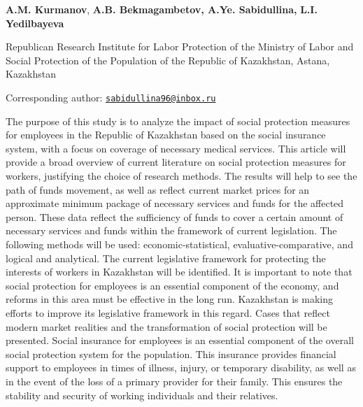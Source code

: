 
\begin{articleheader}

{\bfseries A.M. Kurmanov}, {\bfseries A.B. Bekmagambetov, A.Ye.
Sabidullina\textsuperscript{\envelope },} {\bfseries L.I. Yedilbayeva}
\end{articleheader}
\begin{affiliation}

Republican Research Institute for Labor Protection of the Ministry of
Labor and Social Protection of the Population of the Republic of
Kazakhstan, Astana, Kazakhstan

\raggedright{\bfseries \textsuperscript{\envelope }}Corresponding author:
\href{mailto:sabidullina96@inbox.ru}{\nolinkurl{sabidullina96@inbox.ru}}
\end{affiliation}

The purpose of this study is to analyze the impact of social protection
measures for employees in the Republic of Kazakhstan based on the social
insurance system, with a focus on coverage of necessary medical
services. This article will provide a broad overview of current
literature on social protection measures for workers, justifying the
choice of research methods. The results will help to see the path of
funds movement, as well as reflect current market prices for an
approximate minimum package of necessary services and funds for the
affected person. These data reflect the sufficiency of funds to cover a
certain amount of necessary services and funds within the framework of
current legislation. The following methods will be used:
economic-statistical, evaluative-comparative, and logical and
analytical. The current legislative framework for protecting the
interests of workers in Kazakhstan will be identified. It is important
to note that social protection for employees is an essential component
of the economy, and reforms in this area must be effective in the long
run. Kazakhstan is making efforts to improve its legislative framework
in this regard. Cases that reflect modern market realities and the
transformation of social protection will be presented. Social insurance
for employees is an essential component of the overall social protection
system for the population. This insurance provides financial support to
employees in times of illness, injury, or temporary disability, as well
as in the event of the loss of a primary provider for their family. This
ensures the stability and security of working individuals and their
relatives.

